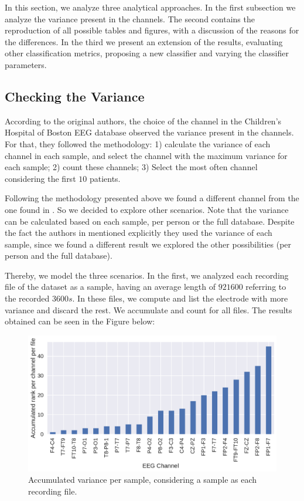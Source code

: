 In this section, we analyze three analytical approaches. In the first subsection we analyze the variance present in the channels. The second contains the reproduction of all possible tables and figures, with a discussion of the reasons for the differences. In the third we present an extension of the results, evaluating other classification metrics, proposing a new classifier and varying the classifier parameters.

\subsection{Checking the Variance} 

According to the original authors, the choice of the channel in the Children's Hospital of Boston EEG database observed the variance present in the channels. For that, they followed the methodology: 1) calculate the variance of each channel in each sample, and select the channel with the maximum variance for each sample; 2) count these channels; 3) Select the most often channel considering the first $10$ patients.

Following the methodology presented above we found a different channel from the one found in \cite{WenZha:2018}. So we decided to explore other scenarios. Note that the variance can be calculated based on each sample, per person or the full database. Despite the fact the authors in \cite{WenZha:2018} mentioned explicitly they used the variance of each sample, since we found a different result we explored the other possibilities (per person and the full database).

Thereby, we model the three scenarios. In the first, we analyzed each recording file of the dataset as a sample, having an average length of $921600$ referring to the recorded $3600s$. In these files, we compute and list the electrode with more variance and discard the rest. We accumulate and count for all files. The results obtained can be seen in the Figure below:

\begin{figure}[!ht]
  \centering
  \includegraphics[width=\linewidth]{figure/variance_per_file.pdf}
  \caption{Accumulated variance per sample, considering a sample as each recording file.}
  \label{fig:variance_per_file}
\end{figure}

